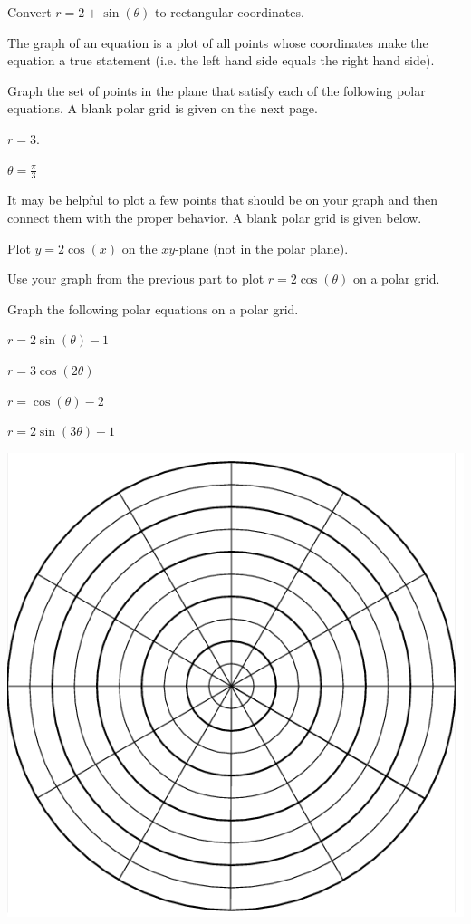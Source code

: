 \bq Convert $r=2+\sin(\theta)$ to rectangular coordinates.
\eq

\begin{info} The graph of an equation is a plot of all points whose coordinates make the equation a true statement (i.e. the left hand side equals the right hand side).

\end{info}

\bq Graph the set of points in the plane that satisfy each of the following polar equations.
A blank polar grid  is given on the next page. \be
\item $r=3$.
\item $\theta=\frac{\pi}{3}$
\ee \eq

\bq It may be helpful to plot a few points that should be on your graph and then connect them with the proper behavior. A blank polar grid is given below.
\be
\item Plot $y=2\cos(x)$ on the $xy$-plane (not in the polar plane).
\item Use your graph from the previous part to plot $r=2\cos(\theta)$ on a polar grid.
\ee
\eq

\bq Graph the following  polar equations on a polar grid.
\be
\item $r=2\sin(\theta)-1$
\item $r=3\cos(2\theta)$
\item $r=\cos(\theta)-2$
\item $r=2\sin(3 \theta)-1$
\ee
\eq

\begin{center} \includegraphics[scale=.75]{polargrid.png} \end{center}


